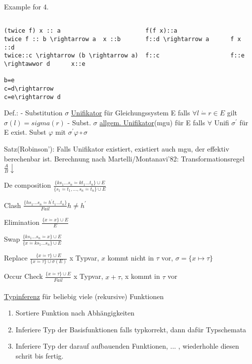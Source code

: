 \documentclass[12pt]{article}
\begin{document}
Example for 4.
\begin{verbatim}

(twice f) x :: a 						f(f x)::a
twice f :: b \rightarrow a 	x ::b		f::d \rightarrow a  	f x ::d
twice::c \rightarrow (b \rightarrow a) 	f::c					f::e \rightawwor d  	x::e

b=e
c=d\rightarrow
c=e\rightarrow d
\end{verbatim}

Def.: - Substitution $\sigma$ \underline{Unifikator} für Gleichungssystem E falls $\forall l \dot{=} r \in E$ gilt $\sigma(l)=sigma(r)$
	- Subst. $\sigma$ \underline{allgem. Unifikator}(mgu) für E falls $\forall$ Unifi $\sigma^\prime$ für E exist. Subst $\varphi$ mit $\sigma^\prime \varphi \circ \sigma$
	
Satz(Robinson'): Falls Unifikator existiert, existiert auch mgu, der effektiv berechenbar ist.
Berechnung nach Martelli/Montanavi'82: Transformationsregel $\frac{A}{B}\downarrow$

De composition $\frac{\{k s_1 ... s_n \dot{=}k t_1 ... t_n \}\cup E}{\{s_1 \dot{=} t_1, ..., s_n \dot{=}t_n\} \cup E}$

Clash $\frac{\{h s_1 ... s_n \dot{=} h^\prime t_1 ... t_n\}}{Fail} h \neq h^\prime$

Elimination	$\frac{\{x \dot{=} x\} \cup E}{E}$

Swap $\frac{\{k s_1 ... s_n \dot{=} x \} \cup E}{\{x \dot{=} k s_1 ... s_n \}\cup E}$

Replace $\frac{\{x \dot{=} \tau\}\cup E}{ \{x \dot{=} \tau\}\cup \sigma(E)}$ x Typvar, $x$ kommt nicht in $\tau$ vor, $\sigma = \{x \mapsto \tau\}$

Occur Check $\frac{\{x\dot{=}\tau\} \cup E}{Fail}$ x Typvar, $x+\tau$, x kommt in $\tau$ vor

\paragraph{}
\underline{Typinferenz} für beliebig viele (rekursive) Funktionen
\begin{enumerate}
\item Sortiere Funktion nach Abhängigkeiten
\item Inferiere Typ der Basisfunktionen falls typkorrekt, dann dafür Typschemata
\item Inferiere Typ der darauf aufbauenden Funktionen, ... , wiederhohle diesen schrit bis fertig.
\end{enumerate}
\end{document}
